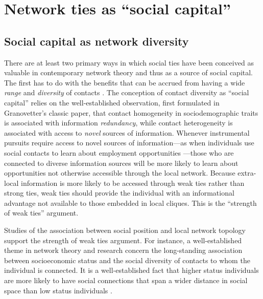 \documentclass[12pt]{article}
\begin{document}
\section{Network ties as ``social capital''}
\subsection{Social capital as network diversity}
There are at least two primary ways in which social ties have been conceived as valuable in contemporary network theory and thus as a source of social capital.  The first has to do with the benefits that can be accrued from having a wide \emph{range} and \emph{diversity} of contacts \citep{burt82, burt83, burt92, lin_dumin86}. The conception of contact diversity as ``social capital'' relies on the well-established observation, first formulated in Granovetter's \citeyearpar{granovetter73} classic paper, that contact homogeneity in sociodemographic traits is associated with information \emph{redundancy}, while contact heterogeneity is associated with access to \emph{novel} sources of information. Whenever instrumental pursuits require access to novel sources of information---as when individuals use social contacts to learn about employment opportunities \citep{granovetter95}---those who are connected to diverse information sources will be more likely to learn about opportunities not otherwise accessible through the local network. Because extra-local information is more likely to be accessed through weak ties rather than strong ties, weak ties should provide the individual with an informational advantage not available to those embedded in local cliques. This is the ``strength of weak ties'' argument.

Studies of the association between social position and local network topology support the strength of weak ties argument. For instance, a well-established theme in network theory and research concern the long-standing association between socioeconomic status and the social diversity of contacts to whom the individual is connected. It is a well-established fact that higher status individuals are more likely to have social connections that span a wider distance in social space than low status individuals \citep{lin01a, lin01b}. 
\end{document}

